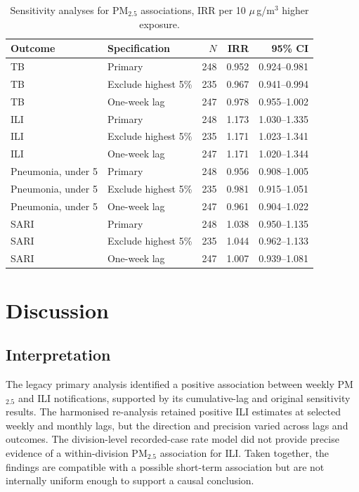 \documentclass[12pt,a4paper]{report}
\newcommand{\pmfive}{PM$_{2.5}$}
\newcommand{\ugm}{\ensuremath{\mu}\,g/m$^3$}
\begin{document}
\begin{table}[htbp]
\centering
\caption{Sensitivity analyses for \pmfive{} associations, IRR per 10 \ugm{} higher exposure.}
\label{tab:sensitivity}
\begin{tabular}{llrrr}
\toprule
Outcome & Specification & $N$ & IRR & 95\% CI \\
\midrule
TB & Primary & 248 & 0.952 & 0.924--0.981 \\
TB & Exclude highest 5\% & 235 & 0.967 & 0.941--0.994 \\
TB & One-week lag & 247 & 0.978 & 0.955--1.002 \\
ILI & Primary & 248 & 1.173 & 1.030--1.335 \\
ILI & Exclude highest 5\% & 235 & 1.171 & 1.023--1.341 \\
ILI & One-week lag & 247 & 1.171 & 1.020--1.344 \\
Pneumonia, under 5 & Primary & 248 & 0.956 & 0.908--1.005 \\
Pneumonia, under 5 & Exclude highest 5\% & 235 & 0.981 & 0.915--1.051 \\
Pneumonia, under 5 & One-week lag & 247 & 0.961 & 0.904--1.022 \\
SARI & Primary & 248 & 1.038 & 0.950--1.135 \\
SARI & Exclude highest 5\% & 235 & 1.044 & 0.962--1.133 \\
SARI & One-week lag & 247 & 1.007 & 0.939--1.081 \\
\bottomrule
\end{tabular}
\end{table}

\chapter{Discussion}
\section{Interpretation}
The legacy primary analysis identified a positive association between weekly \pmfive{} and ILI notifications, supported by its cumulative-lag and original sensitivity results. The harmonised re-analysis retained positive ILI estimates at selected weekly and monthly lags, but the direction and precision varied across lags and outcomes. The division-level recorded-case rate model did not provide precise evidence of a within-division \pmfive{} association for ILI. Taken together, the findings are compatible with a possible short-term association but are not internally uniform enough to support a causal conclusion.
\end{document}
